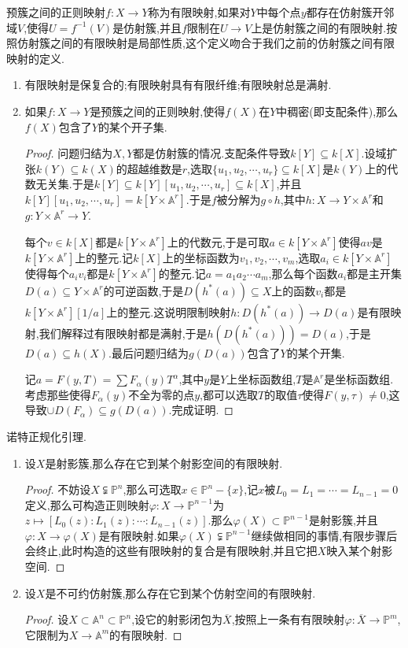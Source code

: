 预簇之间的正则映射$f:X\to Y$称为有限映射,如果对$Y$中每个点$y$都存在仿射簇开邻域$V$,使得$U=f^{-1}(V)$是仿射簇,并且$f$限制在$U\to V$上是仿射簇之间的有限映射.按照仿射簇之间的有限映射是局部性质,这个定义吻合于我们之前的仿射簇之间有限映射的定义.
\begin{enumerate}
	\item 有限映射是保复合的;有限映射具有有限纤维;有限映射总是满射.
	\item 如果$f:X\to Y$是预簇之间的正则映射,使得$f(X)$在$Y$中稠密(即支配条件),那么$f(X)$包含了$Y$的某个开子集.
	\begin{proof}
		
		问题归结为$X,Y$都是仿射簇的情况.支配条件导致$k[Y]\subseteq k[X]$.设域扩张$k(Y)\subseteq k(X)$的超越维数是$r$,选取$\{u_1,u_2,\cdots,u_r\}\subseteq k[X]$是$k(Y)$上的代数无关集.于是$k[Y]\subseteq k[Y][u_1,u_2,\cdots,u_r]\subseteq k[X]$,并且$k[Y][u_1,u_2,\cdots,u_r]=k[Y\times\mathbb{A}^r]$.于是$f$被分解为$g\circ h$,其中$h:X\to Y\times\mathbb{A}^r$和$g:Y\times\mathbb{A}^r\to Y$.
		
		每个$v\in k[X]$都是$k[Y\times\mathbb{A}^r]$上的代数元,于是可取$a\in k[Y\times\mathbb{A}^r]$使得$av$是$k[Y\times\mathbb{A}^r]$上的整元.记$k[X]$上的坐标函数为$v_1,v_2,\cdots,v_m$,选取$a_i\in k[Y\times\mathbb{A}^r]$使得每个$a_iv_i$都是$k[Y\times\mathbb{A}^r]$的整元.记$a=a_1a_2\cdots a_m$,那么每个函数$a_i$都是主开集$D(a)\subseteq Y\times\mathbb{A}^r$的可逆函数,于是$D(h^*(a))\subseteq X$上的函数$v_i$都是$k[Y\times\mathbb{A}^r][1/a]$上的整元.这说明限制映射$h:D(h^*(a))\to D(a)$是有限映射,我们解释过有限映射都是满射,于是$h(D(h^*(a)))=D(a)$,于是$D(a)\subseteq h(X)$.最后问题归结为$g(D(a))$包含了$Y$的某个开集.
		
		记$a=F(y,T)=\sum F_{\alpha}(y)T^{\alpha}$,其中$y$是$Y$上坐标函数组,$T$是$\mathbb{A}^r$是坐标函数组.考虑那些使得$F_{\alpha}(y)$不全为零的点$y$,都可以选取$T$的取值$\tau$使得$F(y,\tau)\not=0$,这导致$\cup D(F_{\alpha})\subseteq g(D(a))$.完成证明.
	\end{proof}
\end{enumerate}

诺特正规化引理.
\begin{enumerate}
	\item 设$X$是射影簇,那么存在它到某个射影空间的有限映射.
	\begin{proof}
		
		不妨设$X\subsetneqq\mathbb{P}^n$,那么可选取$x\in\mathbb{P}^n-\{x\}$,记$x$被$L_0=L_1=\cdots=L_{n-1}=0$定义,那么可构造正则映射$\varphi:X\to\mathbb{P}^{n-1}$为$z\mapsto[L_0(z):L_1(z):\cdots:L_{n-1}(z)]$.那么$\varphi(X)\subset\mathbb{P}^{n-1}$是射影簇,并且$\varphi:X\to\varphi(X)$是有限映射.如果$\varphi(X)\subsetneqq\mathbb{P}^{n-1}$继续做相同的事情,有限步骤后会终止,此时构造的这些有限映射的复合是有限映射,并且它把$X$映入某个射影空间.
	\end{proof}
	\item 设$X$是不可约仿射簇,那么存在它到某个仿射空间的有限映射.
	\begin{proof}
		
		设$X\subset\mathbb{A}^n\subset\mathbb{P}^n$,设它的射影闭包为$\overline{X}$,按照上一条有有限映射$\varphi:\overline{X}\to\mathbb{P}^m$,它限制为$X\to\mathbb{A}^m$的有限映射.
	\end{proof}
\end{enumerate}

